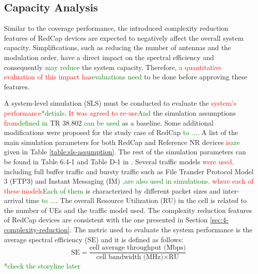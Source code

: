 \documentclass[]{IEEEtran}
\newcommand{\CAREPL}[2]{\textcolor{red}{#1}\textcolor{green}{#2}}
\begin{document}
\subsection{Capacity Analysis}
\label{sec:6-2}

Similar to the coverage performance, the introduced complexity reduction features of RedCap devices are expected to negatively affect the overall system capacity. 
Simplifications, such as reducing the number of antennas and the modulation order, have a direct impact on the spectral efficiency and consequently \CAREPL{}{may reduce} the system capacity. 
Therefore, \CAREPL{a quantitative evaluation of this impact has}{evaluations need} to be done before approving these features.

A system-level simulation (SLS) must be conducted to evaluate the \CAREPL{system's performance}{*detials}. 
\CAREPL{It was agreed to re-use}{And} the simulation assumptions \CAREPL{from}{defined in} TR 38.802 \cite{3gpp_study_nodate-2_38.802} \CAREPL{}{can be used} as a baseline. 
Some additional modifications were proposed for the study case of RedCap \CAREPL{}{to ...}. 
A list of the main simulation parameters for both RedCap and Reference NR devices \CAREPL{is}{are} given in Table \ref{table:sls-assumption}. 
The rest of the simulation parameters can be found in Table 6.4-1 and Table D-1 in \cite{3gpp_study_2021_38.875}. 
Several traffic models \CAREPL{were used}, including full buffer traffic and bursty traffic such as File Transfer Protocol Model 3 (FTP3) and Instant Messaging (IM) \CAREPL{,}{are also used in simulations.} \CAREPL{where each of these models}{Each of them} is characterized by different packet sizes and inter-arrival time \CAREPL{}{to ...}. 
The overall Resource Utilization (RU) in the cell is related to the number of UEs and the traffic model used. The complexity reduction features of RedCap devices are consistent with the one presented in Section \ref{sec:4-complexity-reduction}. The metric used to evaluate the system performance is the average spectral efficiency (SE) and it is defined as follows:
\begin{equation}
\textrm{SE}=\frac{\textrm{cell average throughput (Mbps)}}{\textrm{cell bandwidth (MHz)}\times\textrm{RU}}
\label{equ:spectral-efficiency}
\end{equation}
\CAREPL{}{*check the storyline later}
\end{document}
